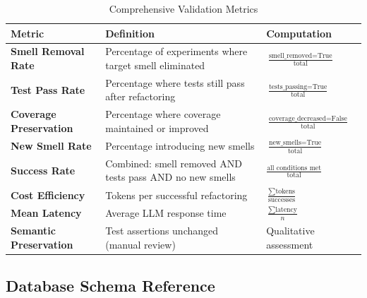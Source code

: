 \begin{table}[h]
\centering
\caption{Comprehensive Validation Metrics}
\label{tab:metrics-definitions}
\small
\begin{tabular}{@{}p{3.5cm}p{5cm}p{4.5cm}@{}}
\toprule
\textbf{Metric} & \textbf{Definition} & \textbf{Computation} \\ \midrule
\textbf{Smell Removal Rate} & 
  Percentage of experiments where target smell eliminated & 
  $\frac{\text{smell\_removed} = \text{True}}{\text{total}}$ \\
\addlinespace
\textbf{Test Pass Rate} & 
  Percentage where tests still pass after refactoring & 
  $\frac{\text{tests\_passing} = \text{True}}{\text{total}}$ \\
\addlinespace
\textbf{Coverage Preservation} & 
  Percentage where coverage maintained or improved & 
  $\frac{\text{coverage\_decreased} = \text{False}}{\text{total}}$ \\
\addlinespace
\textbf{New Smell Rate} & 
  Percentage introducing new smells & 
  $\frac{\text{new\_smells} = \text{True}}{\text{total}}$ \\
\addlinespace
\textbf{Success Rate} & 
  Combined: smell removed AND tests pass AND no new smells & 
  $\frac{\text{all conditions met}}{\text{total}}$ \\
\addlinespace
\textbf{Cost Efficiency} & 
  Tokens per successful refactoring & 
  $\frac{\sum \text{tokens}}{\text{successes}}$ \\
\addlinespace
\textbf{Mean Latency} & 
  Average LLM response time & 
  $\frac{\sum \text{latency}}{n}$ \\
\addlinespace
\textbf{Semantic Preservation} & 
  Test assertions unchanged (manual review) & 
  Qualitative assessment \\ \bottomrule
\end{tabular}
\end{table}

\subsection{Database Schema Reference}

